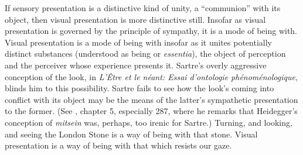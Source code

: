 \documentclass[12pt]{article}
\begin{document}
If sensory presentation is a distinctive kind of unity, a ``communion'' with its object, then visual presentation is more distinctive still. Insofar as visual presentation is governed by the principle of sympathy, it is a mode of being with. Visual presentation is a mode of being with insofar as it unites potentially distinct substances (understood as being or \emph{essentia}), the object of perception and the perceiver whose experience presents it. Sartre’s overly aggressive conception of the look, in \emph{L’Être et le néant: Essai d’ontologie phénoménologique}, blinds him to this possibility. Sartre fails to see how the look’s coming into conflict with its object may be the means of the latter’s sympathetic presentation to the former. (See \citealt{Jay:1994aa}, chapter 5, especially 287, where he remarks that Heidegger’s conception of \emph{mitsein} was, perhaps, too irenic for Sartre.) Turning, and looking, and seeing the London Stone is a way of being with that stone. Visual presentation is a way of being with that which resists our gaze.



\nocite{Broadie:1993dz}
\nocite{Hicks:1907uq}



\end{document}

